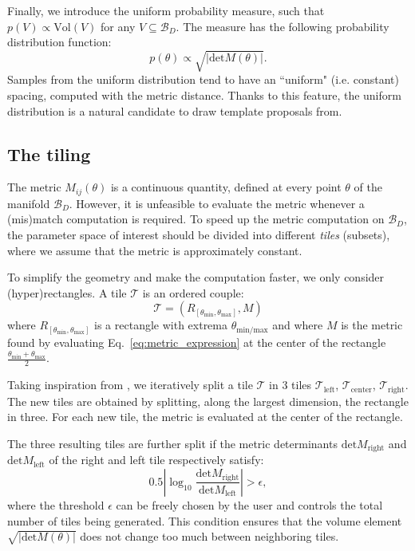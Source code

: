 \documentclass[twocolumn,showpacs,preprintnumbers,nofootinbib,prd,
superscriptaddress,10pt]{revtex4-2}
\begin{document}
Finally, we introduce the uniform probability measure, such that $p(V) \propto \text{Vol}(V)$ for any $V\subseteq \mathcal{B}_D$. The measure has the following probability distribution function:
\begin{equation}\label{eq:pdf_uniform}
	p(\theta) \propto \sqrt{|\text{det}M(\theta)|}.
\end{equation}
Samples from the uniform distribution tend to have an ``uniform" (i.e. constant) spacing, computed with the metric distance. Thanks to this feature, the uniform distribution is a natural candidate to draw template proposals from.

\subsection{The tiling} \label{sec:tiling}

The metric $M_{ij}(\theta)$ is a continuous quantity, defined at every point $\theta$ of the manifold $\mathcal{B}_D$.
However, it is unfeasible to evaluate the metric whenever a (mis)match computation is required.
To speed up the metric computation on $\mathcal{B}_D$, the parameter space of interest should be divided into different {\it tiles} (subsets), where we assume that the metric is approximately constant.

To simplify the geometry and make the computation faster, we only consider (hyper)rectangles. A tile $\mathcal{T}$ is an ordered couple:
\begin{equation} \label{eq:tile}
	\mathcal{T} = \left(R_{[\theta_\text{min}, \theta_\text{max}]}, M \right)
\end{equation}
where $R_{[\theta_\text{min}, \theta_\text{max}]}$ is a rectangle with extrema $\theta_{\text{min/max}}$ and where $M$ is the metric found by evaluating Eq.~\eqref{eq:metric_expression} at the center of the rectangle $\frac{\theta_\text{min}+\theta_\text{max}}{2}$.

Taking inspiration from \cite{Hanna:2022zpk}, we iteratively split a tile $\mathcal{T}$ in 3 tiles $\mathcal{T}_\text{left}$, $\mathcal{T}_\text{center}$, $\mathcal{T}_\text{right}$. The new tiles are obtained by splitting, along the largest dimension, the rectangle in three. For each new tile, the metric is evaluated at the center of the rectangle.

The three resulting tiles are further split if the metric determinants $\text{det}M_\text{right}$ and $\text{det}M_\text{left}$ of the right and left tile respectively satisfy:
\begin{equation}\label{eq:stop_tiling}
	0.5\left|\log_{\textrm{10}}\frac{\text{det} M_\text{right}}{\text{det}M_\text{left}}\right| > \epsilon,
\end{equation}
where the threshold $\epsilon$ can be freely chosen by the user and controls the total number of tiles being generated.
This condition ensures that the volume element $\sqrt{|\text{det}M(\theta)|}$ does not change too much between neighboring tiles.
\end{document}
